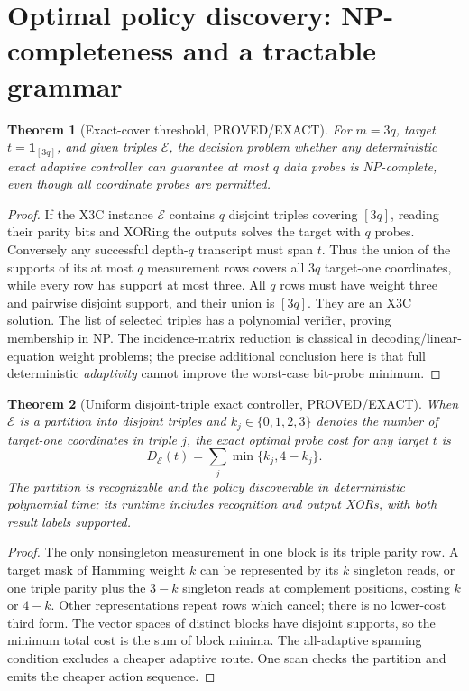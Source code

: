 \documentclass{article}
\newtheorem{theorem}{Theorem}
\begin{document}
\section{Optimal policy discovery: NP-completeness and a tractable grammar}
\begin{theorem}[Exact-cover threshold, PROVED/EXACT]
For $m=3q$, target $t=\mathbf1_{[3q]}$, and given triples $\mathcal E$, the decision problem whether any deterministic exact adaptive controller can guarantee at most $q$ data probes is NP-complete, even though all coordinate probes are permitted.
\end{theorem}
\begin{proof}
If the X3C instance $\mathcal E$ contains $q$ disjoint triples covering $[3q]$, reading their parity bits and XORing the outputs solves the target with $q$ probes. Conversely any successful depth-$q$ transcript must span $t$. Thus the union of the supports of its at most $q$ measurement rows covers all $3q$ target-one coordinates, while every row has support at most three. All $q$ rows must have weight three and pairwise disjoint support, and their union is $[3q]$. They are an X3C solution. The list of selected triples has a polynomial verifier, proving membership in NP. The incidence-matrix reduction is classical in decoding/linear-equation weight problems; the precise additional conclusion here is that full deterministic \emph{adaptivity} cannot improve the worst-case bit-probe minimum.
\end{proof}

\begin{theorem}[Uniform disjoint-triple exact controller, PROVED/EXACT]
When $\mathcal E$ is a partition into disjoint triples and $k_j\in\{0,1,2,3\}$ denotes the number of target-one coordinates in triple $j$, the exact optimal probe cost for any target $t$ is
\[
D_{\mathcal E}(t)=\sum_j\min\{k_j,4-k_j\}.
\]
The partition is recognizable and the policy discoverable in deterministic polynomial time; its runtime includes recognition and output XORs, with both result labels supported.
\end{theorem}
\begin{proof}
The only nonsingleton measurement in one block is its triple parity row. A target mask of Hamming weight $k$ can be represented by its $k$ singleton reads, or one triple parity plus the $3-k$ singleton reads at complement positions, costing $k$ or $4-k$. Other representations repeat rows which cancel; there is no lower-cost third form. The vector spaces of distinct blocks have disjoint supports, so the minimum total cost is the sum of block minima. The all-adaptive spanning condition excludes a cheaper adaptive route. One scan checks the partition and emits the cheaper action sequence.
\end{proof}
\end{document}
